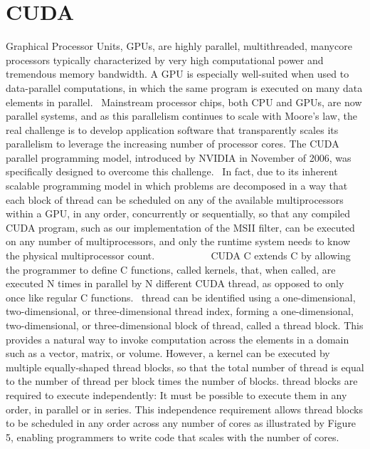 \documentclass{article}
\begin{document}
\section{CUDA}
Graphical Processor Units, GPUs, are highly parallel, multithreaded, manycore processors typically characterized by very high computational power and tremendous memory bandwidth. A GPU is especially well-suited when used to data-parallel computations, in which the same program is executed on many data elements in parallel.~\cite[p.~1.1]{CUDA18}
Mainstream processor chips, both CPU and GPUs, are now parallel systems, and as this parallelism continues to scale with Moore's law, the real challenge is to develop application software that transparently scales its parallelism to leverage the increasing number of processor cores. The CUDA parallel programming model, introduced by NVIDIA in November of 2006, was specifically designed to overcome this challenge.~\cite[p.~1.3]{CUDA18}
In fact, due to its inherent scalable programming model in which problems are decomposed in a way that each block of thread can be scheduled on any of the available multiprocessors within a GPU, in any order, concurrently or sequentially, so that any compiled CUDA program, such as our implementation of the MSII filter, can be executed on any number of multiprocessors, and only the runtime system needs to know the physical multiprocessor count.~\cite[p.~1.3]{CUDA18}
~~~~~~~~~
CUDA C extends C by allowing the programmer to define C functions, called kernels, that, when called, are executed N times in parallel by N different CUDA thread, as opposed to only once like regular C functions.~\cite[p.~2.1]{CUDA18}
thread can be identified using a one-dimensional, two-dimensional, or three-dimensional thread index, forming a one-dimensional, two-dimensional, or three-dimensional block of thread, called a thread block. This provides a natural way to invoke computation across the elements in a domain such as a vector, matrix, or volume. However, a kernel can be executed by multiple equally-shaped thread blocks, so that the total number of thread is equal to the number of thread per block times the number of blocks. thread blocks are required to execute independently: It must be possible to execute them in any order, in parallel or in series. This independence requirement allows thread blocks to be scheduled in any order across any number of cores as illustrated by Figure 5, enabling programmers to write code that scales with the number of cores.~\cite[p.~2.2]{CUDA18}
\end{document}
